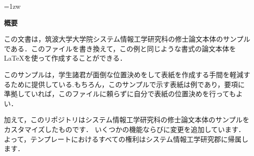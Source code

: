 \thispagestyle{empty}
\vspace*{20pt plus 1fil}
\parindent=1zw
\noindent

\begin{center}
    {\bf 概要}
    \vspace{5mm}
\end{center}

この文書は，筑波大学大学院システム情報工学研究科の修士論文本体のサンプル
である．このファイルを書き換えて，この例と同じような書式の論文本体を
\LaTeX を使って作成することができる．

このサンプルは，学生諸君が面倒な位置決めをして表紙を作成する手間を軽減す
るために提供している.もちろん，このサンプルで示す表紙は例であり，要項に
準拠していれば，このファイルに頼らずに自分で表紙の位置決めを行ってもよい．

\vspace{10mm}

加えて，このリポジトリはシステム情報工学研究科の修士論文本体のサンプルをカスタマイズしたものです．
いくつかの機能ならびに変更を追加しています．
よって，テンプレートにおけるすべての権利はシステム情報工学研究郡に帰属します．

\vspace{0pt plus 1fil}
\newpage